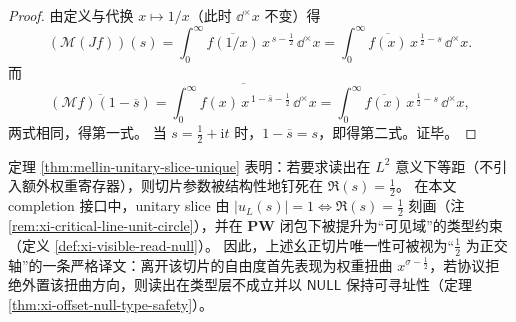 \begin{proof}
由定义与代换 \(x\mapsto 1/x\)（此时 \(\dd^{\times}x\) 不变）得
\[
(\mathcal{M}(Jf))(s)
=\int_{0}^{\infty}\overline{f(1/x)}\,x^{\,s-\frac12}\,\dd^{\times}x
=\int_{0}^{\infty}\overline{f(x)}\,x^{\,\frac12-s}\,\dd^{\times}x.
\]
而
\[
\overline{(\mathcal{M}f)(1-\overline{s})}
=\overline{\int_{0}^{\infty} f(x)\,x^{\,1-\overline{s}-\frac12}\,\dd^{\times}x}
=\int_{0}^{\infty}\overline{f(x)}\,x^{\,\frac12-s}\,\dd^{\times}x,
\]
两式相同，得第一式。
当 \(s=\tfrac12+\mathrm{i}t\) 时，\(1-\overline{s}=s\)，即得第二式。证毕。
\end{proof}

\begin{remark}\label{rem:mellin-unitary-slice-semantic-alignment}
定理 \ref{thm:mellin-unitary-slice-unique} 表明：若要求读出在 \(L^{2}\) 意义下等距（不引入额外权重寄存器），则切片参数被结构性地钉死在 \(\Re(s)=\tfrac12\)。
在本文 completion 接口中，unitary slice 由 \(|u_{L}(s)|=1\iff \Re(s)=\tfrac12\) 刻画（注 \ref{rem:xi-critical-line-unit-circle}），并在 \(\mathbf{PW}\) 闭包下被提升为“可见域”的类型约束（定义 \ref{def:xi-visible-read-null}）。
因此，上述幺正切片唯一性可被视为“\(\tfrac12\) 为正交轴”的一条严格译文：离开该切片的自由度首先表现为权重扭曲 \(x^{\sigma-\frac12}\)，若协议拒绝外置该扭曲方向，则读出在类型层不成立并以 \(\mathsf{NULL}\) 保持可寻址性（定理 \ref{thm:xi-offset-null-type-safety}）。
\end{remark}

\endinput
